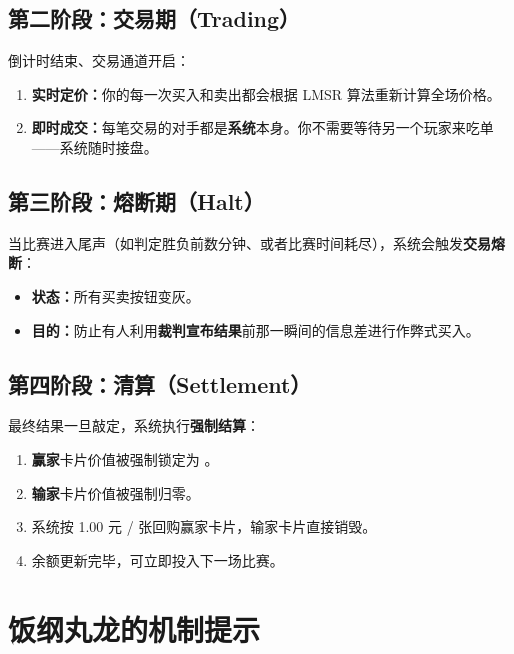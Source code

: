 \documentclass[11pt,a4paper,twoside]{article}
\begin{document}
\subsection{第二阶段：交易期（Trading）}

倒计时结束、交易通道开启：

\begin{enumerate}
  \item \textbf{实时定价：}你的每一次买入和卖出都会根据 LMSR 算法重新计算全场价格。
  \item \textbf{即时成交：}每笔交易的对手都是\textbf{系统}本身。你不需要等待另一个玩家来吃单——系统随时接盘。
\end{enumerate}

\subsection{第三阶段：熔断期（Halt）}

当比赛进入尾声（如判定胜负前数分钟、或者比赛时间耗尽），系统会触发\textbf{交易熔断}：

\begin{itemize}
  \item \textbf{状态：}所有买卖按钮变灰。
  \item \textbf{目的：}防止有人利用\textbf{裁判宣布结果}前那一瞬间的信息差进行作弊式买入。
\end{itemize}

\subsection{第四阶段：清算（Settlement）}

最终结果一旦敲定，系统执行\textbf{强制结算}：

\begin{enumerate}
  \item \textbf{赢家}卡片价值被强制锁定为 。
  \item \textbf{输家}卡片价值被强制归零。
  \item 系统按 1.00 元 / 张回购赢家卡片，输家卡片直接销毁。
  \item 余额更新完毕，可立即投入下一场比赛。
\end{enumerate}

\section{饭纲丸龙的机制提示}
\end{document}
